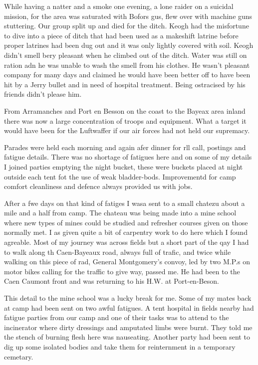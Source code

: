 While having a natter and a smoke one evening, a lone raider on a
suicidal mission, for the area was saturated with Bofors gus, flew
over with machine guns stuttering. Our group split up and died for the
ditch. Keogh had the misfortune to dive into a piece of ditch that had
been used as a makeshift latrine before proper latrines had been dug
out and it was only lightly covered with soil. Keogh didn't smell bery
pleasant when he climbed out of the ditch. Water was still on ration
adn he was unable to wash the smell from his clothes. He wasn't
pleasant company for many days and claimed he would have been better
off to have been hit by a Jerry bullet and in need of hospital
treatment. Being ostracised by his friends didn't please him.

From Arramanches and Port en Besson on the coast to the Bayeax area
inland there was now a large concentration of troops and
equipment. What a target it would have been for the Luftwaffer if our
air forces had not held our supremacy.

Parades were held each morning and again afer dinner for rll call,
postings and fatigue details. There was no shortage of fatigues here
and on some of my details I joined parties emptying the night bucket,
these were buckets placed at night outside each tent fot the use of
weak bladder-bods. Improvementd for camp comfort cleanliness and
defence always provided us with jobs.

After a fwe days on that kind of fatiges I wasa sent to a small
chatezu about a mile and a half from camp. The chateau was being made
into a mine school where new types of mines could be studied and
refresher courses given on those normally met. I as given quite a bit
of carpentry work to do here which I found agreable. Most of my
journey was across fields but a short part of the qay I had to walk
along th Caen-Bayeaux road, always full of trafic, and twice while
walking on this piece of rad, General Montgomery's convoy, led by two
M.P.s on motor bikes calling for the traffic to give way, passed
me. He had been to the Caen Caumont front and was returning to his
H.W. at Port-en-Beson.

This detail to the mine school was a lucky break for me. Some of my
mates back at camp had been sent on two awful fatigues. A tent
hospital in fields nearby had fatigue parties from our camp and one 
of their tasks was to attend to the incinerator where dirty dressings and
amputated limbs were burnt. They told me the stench of burning flesh
here was nauseating. Another party had been sent to dig up some
isolated bodies and take them for reinternment in a temporary
cemetary.

